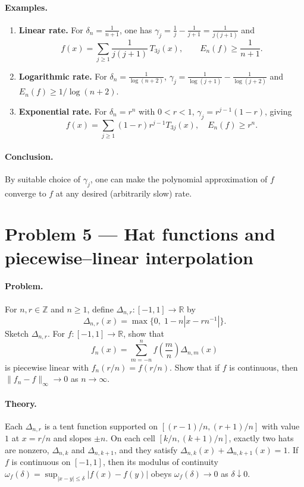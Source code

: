 \documentclass[12pt,a4paper]{article}
\theoremstyle{plain}
\theoremstyle{definition}
\theoremstyle{remark}
\theoremstyle{remark}
\begin{document}
\paragraph{Examples.}
\begin{enumerate}[label=(\arabic*), leftmargin=*]
	\item \textbf{Linear rate.}
	For $\delta_n=\frac{1}{n+1}$, one has
	$\gamma_j=\frac{1}{j}-\frac{1}{j+1}=\frac{1}{j(j+1)}$ and
	\[
	f(x)=\sum_{j\ge1}\frac{1}{j(j+1)}\,T_{3j}(x),
	\qquad E_n(f)\ge\frac{1}{n+1}.
	\]
	\item \textbf{Logarithmic rate.}
	For $\delta_n=\frac{1}{\log(n+2)}$, 
	$\gamma_j=\frac{1}{\log(j+1)}-\frac{1}{\log(j+2)}$ and
	$E_n(f)\ge 1/\log(n+2)$.
	\item \textbf{Exponential rate.}
	For $\delta_n=r^n$ with $0<r<1$, $\gamma_j=r^{j-1}(1-r)$, giving
	\[
	f(x)=\sum_{j\ge1}(1-r)r^{j-1}T_{3j}(x),
	\quad E_n(f)\ge r^n.
	\]
\end{enumerate}

\paragraph{Conclusion.}
By suitable choice of $\gamma_j$, one can make the polynomial approximation
of $f$ converge to $f$ at any desired (arbitrarily slow) rate.

\section*{Problem 5 — Hat functions and piecewise–linear interpolation}

\paragraph{Problem.}
For $n,r\in\mathbb{Z}$ and $n\ge1$, define $\Delta_{n,r}:[-1,1]\to\mathbb{R}$ by
\[
\Delta_{n,r}(x)=\max\{0,\; 1-n|x-rn^{-1}|\}.
\]
Sketch $\Delta_{n,r}$.
For $f:[-1,1]\to\mathbb{R}$, show that
\[
f_n(x)=\sum_{m=-n}^{n} f\!\left(\frac{m}{n}\right)\Delta_{n,m}(x)
\]
is piecewise linear with $f_n(r/n)=f(r/n)$.
Show that if $f$ is continuous, then $\|f_n-f\|_\infty\to0$ as $n\to\infty$.

\paragraph{Theory.}
Each $\Delta_{n,r}$ is a tent function supported on $[(r-1)/n,(r+1)/n]$ with value $1$
at $x=r/n$ and slopes $\pm n$. On each cell $[k/n,(k+1)/n]$, exactly two hats are nonzero,
$\Delta_{n,k}$ and $\Delta_{n,k+1}$, and they satisfy
$\Delta_{n,k}(x)+\Delta_{n,k+1}(x)=1$. If $f$ is continuous on $[-1,1]$, then its modulus
of continuity $\omega_f(\delta)=\sup_{|x-y|\le\delta}|f(x)-f(y)|$ obeys
$\omega_f(\delta)\to0$ as $\delta\downarrow0$.
\end{document}
